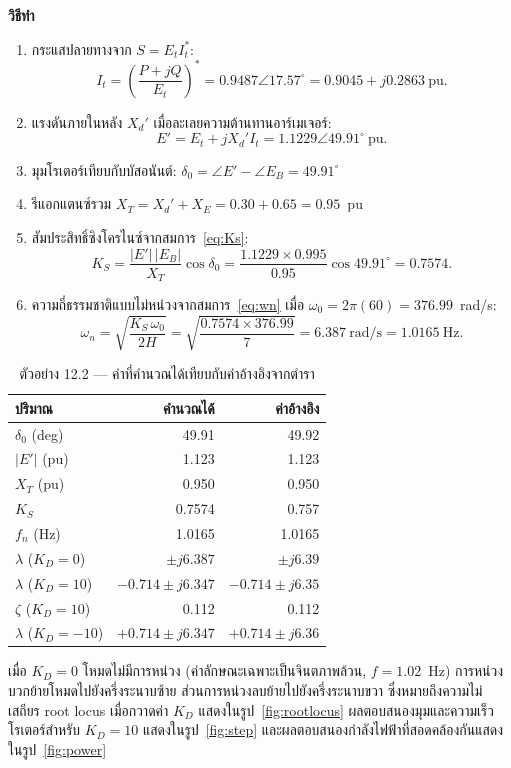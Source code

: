 \documentclass[12pt,a4paper]{article}
\begin{document}
\textbf{วิธีทำ}
\begin{enumerate}
\item กระแสปลายทางจาก $S = E_t I_t^{*}$:
      \[ I_t = \left(\frac{P+jQ}{E_t}\right)^{\!*} = 0.9487\angle 17.57^\circ
         = 0.9045 + j0.2863 \ \text{pu}. \]
\item แรงดันภายในหลัง $X_d'$ เมื่อละเลยความต้านทานอาร์เมเจอร์:
      \[ E' = E_t + jX_d' I_t = 1.1229\angle 49.91^\circ \ \text{pu}. \]
\item มุมโรเตอร์เทียบกับบัสอนันต์:
      $\delta_0 = \angle E' - \angle E_B = 49.91^\circ$
\item รีแอกแตนซ์รวม $X_T = X_d' + X_E = 0.30 + 0.65 = 0.95$~pu
\item สัมประสิทธิ์ซิงโครไนซ์จากสมการ~\eqref{eq:Ks}:
      \[ K_S = \frac{|E'|\,|E_B|}{X_T}\cos\delta_0
             = \frac{1.1229 \times 0.995}{0.95}\cos 49.91^\circ = 0.7574. \]
\item ความถี่ธรรมชาติแบบไม่หน่วงจากสมการ~\eqref{eq:wn} เมื่อ
      $\omega_0 = 2\pi(60) = 376.99$~rad/s:
      \[ \omega_n = \sqrt{\frac{K_S\,\omega_0}{2H}}
         = \sqrt{\frac{0.7574 \times 376.99}{7}} = 6.387\ \text{rad/s}
         = 1.0165\ \text{Hz}. \]
\end{enumerate}

\begin{table}[H]
\centering
\caption{ตัวอย่าง 12.2 --- ค่าที่คำนวณได้เทียบกับค่าอ้างอิงจากตำรา}
\label{tab:modelA}
\begin{tabular}{@{}lrr@{}}
\toprule
ปริมาณ & คำนวณได้ & ค่าอ้างอิง \\
\midrule
$\delta_0$ (deg)        & 49.91 & 49.92 \\
$|E'|$ (pu)             & 1.123 & 1.123 \\
$X_T$ (pu)              & 0.950 & 0.950 \\
$K_S$                   & 0.7574 & 0.757 \\
$f_n$ (Hz)              & 1.0165 & 1.0165 \\
$\lambda$ ($K_D{=}0$)   & $\pm j6.387$ & $\pm j6.39$ \\
$\lambda$ ($K_D{=}10$)  & $-0.714\pm j6.347$ & $-0.714\pm j6.35$ \\
$\zeta$ ($K_D{=}10$)    & 0.112 & 0.112 \\
$\lambda$ ($K_D{=}{-}10$) & $+0.714\pm j6.347$ & $+0.714\pm j6.36$ \\
\bottomrule
\end{tabular}
\end{table}

เมื่อ $K_D=0$ โหมดไม่มีการหน่วง (ค่าลักษณะเฉพาะเป็นจินตภาพล้วน, $f=1.02$~Hz)
การหน่วงบวกย้ายโหมดไปยังครึ่งระนาบซ้าย ส่วนการหน่วงลบย้ายไปยังครึ่งระนาบขวา
ซึ่งหมายถึงความไม่เสถียร
root locus เมื่อกวาดค่า $K_D$ แสดงในรูป~\ref{fig:rootlocus}
ผลตอบสนองมุมและความเร็วโรเตอร์สำหรับ $K_D=10$ แสดงในรูป~\ref{fig:step}
และผลตอบสนองกำลังไฟฟ้าที่สอดคล้องกันแสดงในรูป~\ref{fig:power}
\end{document}
